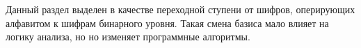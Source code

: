 Данный раздел выделен в качестве переходной ступени от шифров, оперирующих алфавитом к шифрам бинарного уровня. Такая смена базиса мало влияет на логику анализа, но но изменяет программные алгоритмы.

